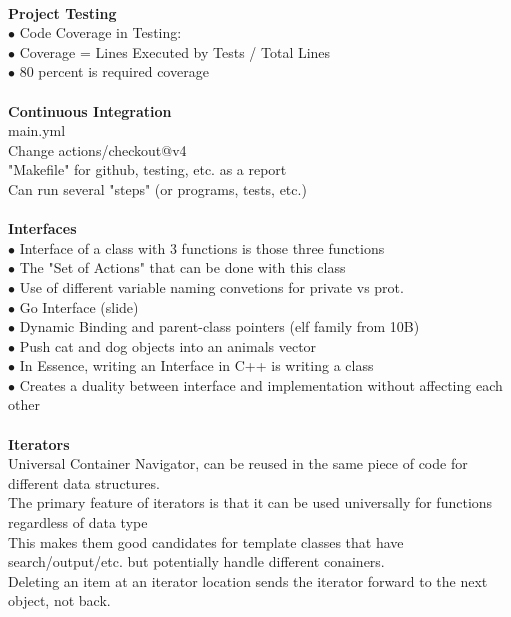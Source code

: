 \documentclass[11pt]{article}
\begin{document}
\\
\textbf{Project Testing}\\
\indent $\bullet$ Code Coverage in Testing:\\
\indent $\bullet$ Coverage = Lines Executed by Tests / Total Lines\\
\indent $\bullet$ 80 percent is required coverage \\
\\
\textbf{Continuous Integration}\\
\indent main.yml\\
\indent Change actions/checkout@v4\\
\indent "Makefile" for github, testing, etc. as a report\\
\indent Can run several "steps" (or programs, tests, etc.)\\
\\
\textbf{Interfaces}\\
\indent $\bullet$ Interface of a class with 3 functions is those three functions \\
\indent $\bullet$ The "Set of Actions" that can be done with this class \\
\indent $\bullet$ Use of different variable naming convetions for private vs prot. \\
\indent $\bullet$ Go Interface (slide) \\
\indent $\bullet$ Dynamic Binding and parent-class pointers (elf family from 10B) \\
\indent $\bullet$ Push cat and dog objects into an animals vector \\
\indent $\bullet$ In Essence, writing an Interface in C++ is writing a class \\
\indent $\bullet$ Creates a duality between interface and implementation without affecting each other \\
\\
\textbf{Iterators}\\
\indent Universal Container Navigator, can be reused in the same piece of code for different data
structures.\\
\indent The primary feature of iterators is that it can be used universally for functions regardless of data type\\
\indent\indent This makes them good candidates for template classes that have search/output/etc. but potentially
handle different conainers.\\
\indent Deleting an item at an iterator location sends the iterator forward to the next object, not back.\\
\end{document}
